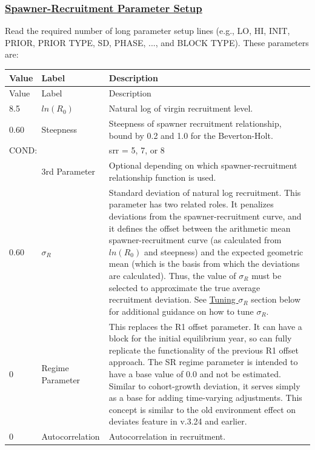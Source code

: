 \subsubsection[Spawner-Recruitment Parameter Setup]{\protect\hyperlink{SRRParam}{Spawner-Recruitment Parameter Setup}}
Read the required number of long parameter setup lines (e.g., LO, HI, INIT, PRIOR, PRIOR TYPE, SD, PHASE, ..., and BLOCK TYPE). These parameters are:
\begin{longtable}{p{1cm} p{3cm} p{11cm}}
	\hline
	Value & Label & Description \Tstrut\Bstrut\\
	\hline
	\endfirsthead

	\hline
	Value & Label & Description \Tstrut\Bstrut\\
	\hline
	\endhead
	\hline
	\endfoot
	\endlastfoot

	8.5 & $ln(R_{0})$ & Natural log of virgin recruitment level. \Tstrut\Bstrut\\
	\hline

	0.60 \Tstrut & Steepness & Steepness of spawner recruitment relationship, bound by 0.2 and 1.0 for the Beverton-Holt. \Bstrut\\

	\multicolumn{2}{l}{COND:} \Tstrut & \gls{srr} = 5, 7, or 8 \\
	& 3rd Parameter & Optional depending on which spawner-recruitment relationship function is used. \Bstrut\\
	\hline

	0.60 \Tstrut & $\sigma_R$ & Standard deviation of natural log recruitment. This parameter has two related roles. It penalizes deviations from the spawner-recruitment curve, and it defines the offset between the arithmetic mean spawner-recruitment curve (as calculated from $ln(R_{0})$ and steepness) and the expected geometric mean (which is the basis from which the deviations are calculated). Thus, the value of $\sigma_R$ must be selected to approximate the true average recruitment deviation. See \hyperlink{TuneSigmaR}{Tuning $\sigma_R$} section below for additional guidance on how to tune $\sigma_R$. \Bstrut\\
	\hline

	0 \Tstrut & Regime Parameter & This replaces the R1 offset parameter. It can have a block for the initial equilibrium year, so can fully replicate the functionality of the previous R1 offset approach. The SR regime parameter is intended to have a base value of 0.0 and not be estimated. Similar to cohort-growth deviation, it serves simply as a base for adding time-varying adjustments. This concept is similar to the old environment effect on deviates feature in v.3.24 and earlier. \Bstrut\\
	\hline

	0 & Autocorrelation & Autocorrelation in recruitment. \Tstrut\Bstrut\\
	\hline
\end{longtable}


